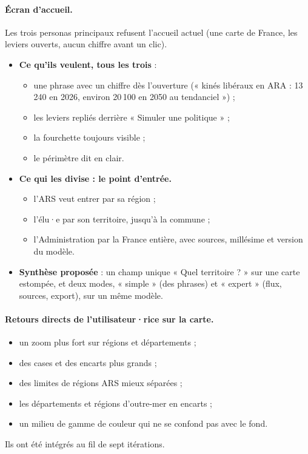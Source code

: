 \paragraph{Écran d'accueil.} Les trois personas principaux refusent l'accueil actuel (une
carte de France, les leviers ouverts, aucun chiffre avant un clic).
\begin{itemize}
  \item \textbf{Ce qu'ils veulent, tous les trois} :
        \begin{itemize}
          \item une phrase avec un chiffre dès l'ouverture (« kinés libéraux en ARA : 13\,240
                en 2026, environ 20\,100 en 2050 au tendanciel ») ;
          \item les leviers repliés derrière « Simuler une politique » ;
          \item la fourchette toujours visible ;
          \item le périmètre dit en clair.
        \end{itemize}
  \item \textbf{Ce qui les divise : le point d'entrée.}
        \begin{itemize}
          \item l'ARS veut entrer par sa région ;
          \item l'élu·e par son territoire, jusqu'à la commune ;
          \item l'Administration par la France entière, avec sources, millésime et version du
                modèle.
        \end{itemize}
  \item \textbf{Synthèse proposée} : un champ unique « Quel territoire ? » sur une carte
        estompée, et deux modes, « simple » (des phrases) et « expert » (flux, sources,
        export), sur un même modèle.
\end{itemize}

\paragraph{Retours directs de l'utilisateur·rice sur la carte.}
\begin{itemize}
  \item un zoom plus fort sur régions et départements ;
  \item des cases et des encarts plus grands ;
  \item des limites de régions ARS mieux séparées ;
  \item les départements et régions d'outre-mer en encarts ;
  \item un milieu de gamme de couleur qui ne se confond pas avec le fond.
\end{itemize}
Ils ont été intégrés au fil de sept itérations.

